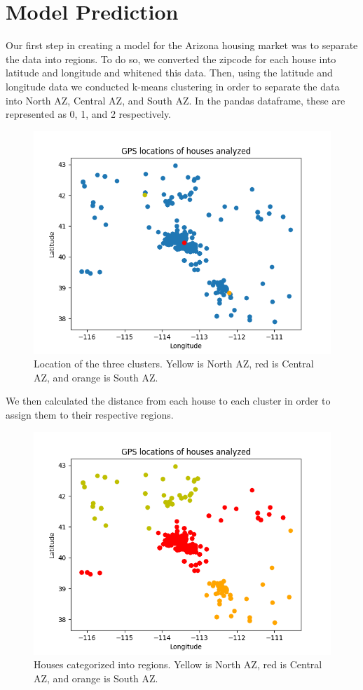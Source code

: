 \documentclass[12pt]{article}
\begin{document}
\section{Model Prediction}
Our first step in creating a model for the Arizona housing market was to separate the data into regions.
To do so, we converted the zipcode for each house into latitude and longitude and whitened this data.
Then, using the latitude and longitude data we conducted k-means clustering in order to separate the data into North AZ, Central AZ, and South AZ.
In the pandas dataframe, these are represented as 0, 1, and 2 respectively.
\begin{figure}[H]
    \centering
    \includegraphics[width=15.5cm]{clusters.png}
    \caption{Location of the three clusters. Yellow is North AZ, red is Central AZ, and orange is South AZ.}
    \label{fig:azclusters}
\end{figure}
We then calculated the distance from each house to each cluster in order to assign them to their respective regions.
\begin{figure}[H]
    \centering
    \includegraphics[width=15cm]{regions.png}
    \caption{Houses categorized into regions. Yellow is North AZ, red is Central AZ, and orange is South AZ.}
    \label{fig:azregions}
\end{figure}
\end{document}
